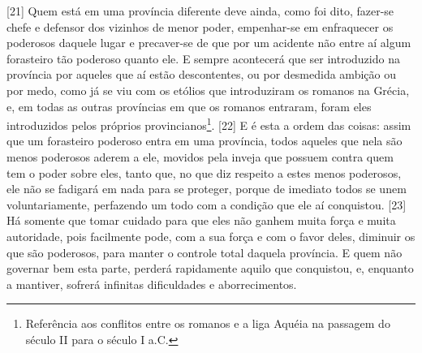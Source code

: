 {[}21{]} Quem está em uma província diferente deve ainda, como foi dito,
fazer-se chefe e defensor dos vizinhos de menor poder, empenhar-se em
enfraquecer os poderosos daquele lugar e precaver-se de que por um
acidente não entre aí algum forasteiro tão poderoso quanto ele. E sempre
acontecerá que ser introduzido na província por aqueles que aí estão
descontentes, ou por desmedida ambição ou por medo, como já se viu com
os etólios que introduziram os romanos na Grécia, e, em todas as outras
províncias em que os romanos entraram, foram eles introduzidos pelos
próprios provincianos\footnote{Referência aos conflitos entre os romanos
  e a liga Aquéia na passagem do século II para o século I a.C.}.
{[}22{]} E é esta a ordem das coisas: assim que um forasteiro poderoso
entra em uma província, todos aqueles que nela são menos poderosos
aderem a ele, movidos pela inveja que possuem contra quem tem o poder
sobre eles, tanto que, no que diz respeito a estes menos poderosos, ele
não se fadigará em nada para se proteger, porque de imediato todos se
unem voluntariamente, perfazendo um todo com a condição que ele aí
conquistou. {[}23{]} Há somente que tomar cuidado para que eles não
ganhem muita força e muita autoridade, pois facilmente pode, com a sua
força e com o favor deles, diminuir os que são poderosos, para manter o
controle total daquela província. E quem não governar bem esta parte,
perderá rapidamente aquilo que conquistou, e, enquanto a mantiver,
sofrerá infinitas dificuldades e aborrecimentos.

